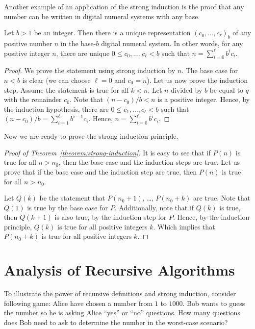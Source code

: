Another example of an application of the strong induction is the proof that
any number can be written in digital numeral systems with any base.
\begin{theorem}
  Let $b > 1$ be an integer. Then there is a unique representation 
  $(c_0, \dots, c_\ell)_b$ of any positive number $n$ in the base-$b$ digital
  numeral system. 
  In other words, for any positive integer $n$, there are unique 
  $0 \le c_0, \dots, c_\ell < b$ such that $n = \sum_{i = 0}^\ell b^i c_i$.
\end{theorem}
\begin{proof}
  We prove the statement using strong induction by $n$. The base case for
  $n < b$ is clear (we can choose $\ell = 0$ and $c_0 = n$).
  Let us now prove the induction step. Assume the statement is true for all
  $k < n$. Let $n$ divided by $b$ be equal to $q$ with the remainder $c_0$.
  Note that $(n - c_0) / b < n$ is a positive integer. Hence,
  by the induction hypothesis, there are
  $0 \le c_1, \dots, c_\ell < b$
  such that $(n - c_0) / b = \sum_{i = 1}^\ell b^{i - 1} c_i$. Hence,
  $n = \sum_{i = 0}^\ell b^i c_i$.
\end{proof}

Now we are ready to prove the strong induction principle.
\begin{proof}[Proof of Theorem~\ref{theorem:strong-induction}]
  It is easy to see that if $P(n)$ is true for all $n > n_0$, then the base
  case and the induction steps are true. Let us prove that if the base case and
  the induction step are true, then $P(n)$ is true for all $n > n_0$.

  Let $Q(k)$ be the statement that $P(n_0 + 1)$, \dots, $P(n_0 + k)$ are true.
  Note that $Q(1)$ is true by the base case for $P$. Additionally, note that if
  $Q(k)$ is true, then $Q(k + 1)$ is also true, by the induction step for $P$.
  Hence, by the induction principle, $Q(k)$ is true for all positive integers
  $k$. Which implies that $P(n_0 + k)$ is true for all positive integers $k$.
\end{proof}


\section{Analysis of Recursive Algorithms}
\label{section:strong-induction-recursive}
To illustrate the power of recursive definitions and strong induction, consider
following game: Alice have chosen a number from $1$ to $1000$. Bob wants to
guess the number so he is asking Alice ``yes'' or ``no'' questions.
How many questions does Bob need to ask to determine the number in the
worst-case scenario?

